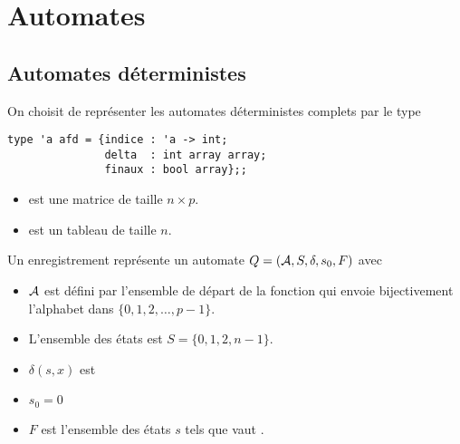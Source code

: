 \chapter{Automates}
\thispagestyle{empty}
\section{Automates déterministes} 
On choisit de représenter les automates déterministes complets par le type
\begin{lstlisting}
type 'a afd = {indice : 'a -> int;
               delta  : int array array;
               finaux : bool array};;
\end{lstlisting}
\begin{itemize}
    \item {} est une matrice de taille $n\times p$.
    \item {} est un tableau de taille $n$.
    \end{itemize}

\medskip

Un enregistrement représente un automate $Q = ({\cal A}, S, \delta, s_0, F)$ avec
\begin{itemize}
    \item ${\cal A}$ est défini par l'ensemble de départ de la fonction  qui envoie bijectivement l'alphabet dans $\{0, 1, 2, \ldots, p-1\}$.
    \item L'ensemble des états est $S = \{0, 1, 2, n-1\}$.
    \item $\delta(s, x)$ est 
    \item $s_0=0$
    \item $F$ est l'ensemble des états $s$ tels que  vaut .
\end{itemize}

